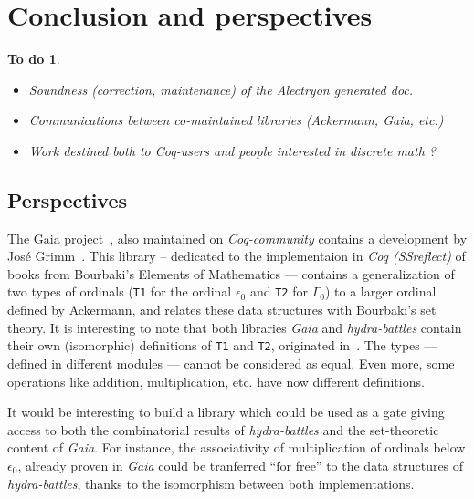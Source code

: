 \documentclass{easychair}
\newtheorem{todo}{To do}
\begin{document}
\section{Conclusion and perspectives}

\begin{todo}
  \begin{itemize}
  \item  Soundness (correction, maintenance) of the Alectryon generated doc.
  \item Communications between co-maintained libraries
          (Ackermann, Gaia, etc.)
  \item Work destined both to Coq-users and people interested in discrete math ?
  \end{itemize}
\end{todo}


\subsection{Perspectives}


The Gaia project~\cite{Gaia}, also maintained on \textit{Coq-community} contains a development by José Grimm~\cite{grimm:hal-00911710}. This library -- dedicated  to the implementaion in \textit{Coq (SSreflect)} of books from  Bourbaki's Elements of Mathematics --- contains a generalization of two types of ordinals (\texttt{T1} for the ordinal $\epsilon_0$ and
\texttt{T2} for $\Gamma_0$) to a larger ordinal defined by Ackermann, and relates these data structures with Bourbaki's set theory.
It is interesting to note that both libraries \textit{Gaia} and \textit{hydra-battles} contain their own (isomorphic) definitions of
\texttt{T1} and \texttt{T2}, originated in~\cite{CantorContrib}.
The types --- defined in different modules --- cannot be considered as equal. Even more, some operations like addition, multiplication, etc. have now different definitions.

It would be interesting to build a library which could be used as a gate giving access to both the combinatorial results of \textit{hydra-battles} and the set-theoretic content of \textit{Gaia}.
For instance, the associativity of multiplication of ordinals below $\epsilon_0$, already proven in \textit{Gaia} could be tranferred ``for free'' to the data structures of \textit{hydra-battles}, thanks to the isomorphism between both implementations.






\label{sect:bib}

%
%
%

\end{document}
